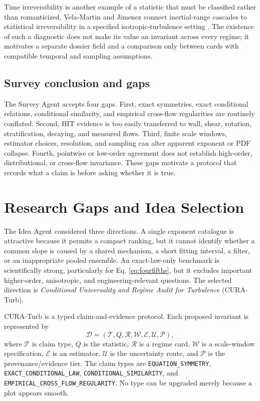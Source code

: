 \documentclass[conference]{../../../../Conference-LaTeX-template_10-17-19/IEEEtran}
\begin{document}
Time irreversibility is another example of a statistic that must be classified rather than romanticized. Vela-Martin and Jimenez connect inertial-range cascades to statistical irreversibility in a specified isotropic-turbulence setting \cite{vela_martin_jimenez_2021}. The existence of such a diagnostic does not make its value an invariant across every regime; it motivates a separate dossier field and a comparison only between cards with compatible temporal and sampling assumptions.

\subsection{Survey conclusion and gaps}
The Survey Agent accepts four gaps. First, exact symmetries, exact conditional relations, conditional similarity, and empirical cross-flow regularities are routinely conflated. Second, HIT evidence is too easily transferred to wall, shear, rotation, stratification, decaying, and measured flows. Third, finite scale windows, estimator choices, resolution, and sampling can alter apparent exponent or PDF collapse. Fourth, pointwise or low-order agreement does not establish high-order, distributional, or cross-flow invariance. These gaps motivate a protocol that records what a claim is before asking whether it is true.

\section{Research Gaps and Idea Selection}
The Idea Agent considered three directions. A single exponent catalogue is attractive because it permits a compact ranking, but it cannot identify whether a common slope is caused by a shared mechanism, a short fitting interval, a filter, or an inappropriate pooled ensemble. An exact-law-only benchmark is scientifically strong, particularly for Eq. \eqref{eq:fourfifths}, but it excludes important higher-order, anisotropic, and engineering-relevant questions. The selected direction is \emph{Conditional Universality and Regime Audit for Turbulence} (CURA-Turb).

CURA-Turb is a typed claim-and-evidence protocol. Each proposed invariant is represented by
\begin{equation}
\mathcal{D}=\left(\mathcal{T},Q,\mathcal{R},\mathcal{W},\mathcal{E},\mathcal{U},\mathcal{P}\right),
\label{eq:dossier}
\end{equation}
where $\mathcal{T}$ is claim type, $Q$ is the statistic, $\mathcal{R}$ is a regime card, $\mathcal{W}$ is a scale-window specification, $\mathcal{E}$ is an estimator, $\mathcal{U}$ is the uncertainty route, and $\mathcal{P}$ is the provenance/evidence tier. The claim types are \texttt{EQUATION\_SYMMETRY}, \texttt{EXACT\_CONDITIONAL\_LAW}, \texttt{CONDITIONAL\_SIMILARITY}, and \texttt{EMPIRICAL\_CROSS\_FLOW\_REGULARITY}. No type can be upgraded merely because a plot appears smooth.
\end{document}
